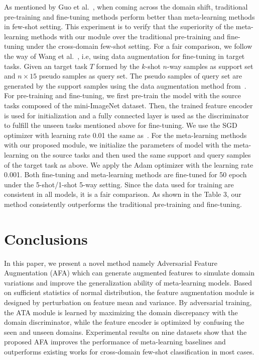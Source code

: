 \documentclass[runningheads]{utils/llncs}
\begin{document}
As mentioned by Guo et al.~\cite{GuoCKCSSRF20}, when coming across the domain shift, traditional pre-training and fine-tuning methods perform better than meta-learning methods in few-shot setting. 
This experiment is to verify that the superiority of the meta-learning methods with our module over the traditional pre-training and fine-tuning under the cross-domain few-shot setting. 
For a fair comparison, we follow the way of Wang et al.~\cite{WangD21}, i.e, using data augmentation for fine-tuning in target tasks. 
Given an target task $T$ formed by the $k$-shot $n$-way samples as support set and $n \times 15$ pseudo samples as query set. 
The pseudo samples of query set are generated by the support samples using the data augmentation method from~\cite{abs09218}. 
For pre-training and fine-tuning, we first pre-train the model with the source tasks composed of the mini-ImageNet dataset. 
Then, the trained feature encoder is used for initialization and a fully connected layer is used as the discriminator to fulfill the unseen tasks mentioned above for fine-tuning. 
We use the SGD optimizer with learning rate 0.01 the same as~\cite{GuoCKCSSRF20}. 
For the meta-learning methods with our proposed module, we initialize the parameters of model with the meta-learning on the source tasks and then used the same support and query samples of the target task as above. 
We apply the Adam optimizer with the learning rate 0.001. 
Both fine-tuning and meta-learning methods are fine-tuned for 50 epoch under the 5-shot/1-shot 5-way setting. 
Since the data used for training are consistent in all models, it is a fair comparison. 
As shown in the Table 3, our method consistently outperforms the traditional pre-training and fine-tuning. 












 \section{Conclusions}

In this paper, we present a novel method namely Adversarial Feature Augmentation (AFA) which can generate augmented features to simulate domain variations and improve the generalization ability of meta-learning models. 
Based on sufficient statistics of normal distribution, the feature augmentation module is designed by perturbation on feature mean and variance.
By adversarial training, the ATA module is learned by maximizing the domain discrepancy with the domain discriminator, while the feature encoder is optimized by confusing the seen and unseen domains. 
Experimental results on nine datasets show that the proposed AFA improves the performance of meta-learning baselines and outperforms existing works for cross-domain few-shot classification in most cases. \\
\end{document}
